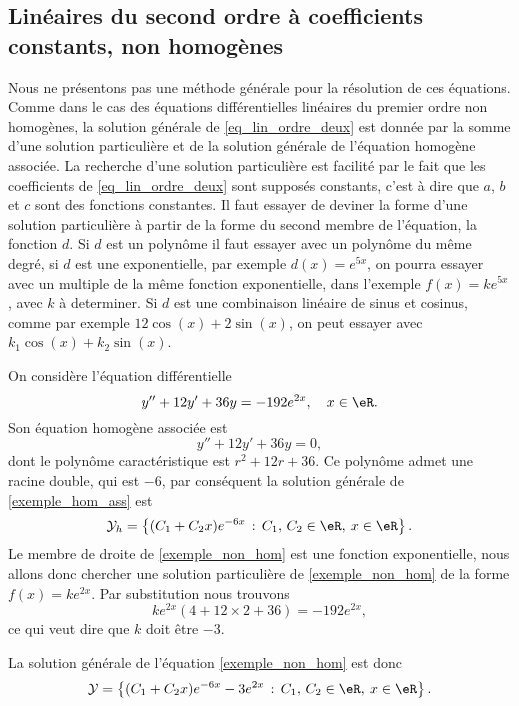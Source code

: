 \subsection{Linéaires du second ordre à coefficients constants, non homogènes}

Nous ne présentons pas une méthode générale pour la résolution de ces équations. Comme dans le cas des équations différentielles linéaires du premier ordre non homogènes, la solution générale de \eqref{eq_lin_ordre_deux} est donnée par la somme d'une solution particulière et de la solution générale de l'équation homogène associée. La recherche d'une solution particulière est facilité par le fait que les coefficients de \eqref{eq_lin_ordre_deux} sont supposés constants, c'est à dire que $a$, $b$ et $c$ sont des fonctions constantes. Il faut essayer de deviner la forme d'une solution particulière à partir de la forme du second membre de l'équation, la fonction $d$. Si $d$ est un polynôme il faut essayer avec un polynôme du même degré, si $d$ est une exponentielle, par exemple $d(x) = e^{5x}$, on pourra essayer avec un multiple de la m\^eme fonction exponentielle, dans l'exemple $f(x) = k e^{5x}$, avec $k$ à determiner. Si $d$ est une combinaison linéaire de sinus et cosinus, comme par exemple $12\cos(x) + 2\sin(x)$, on peut essayer avec $k_1\cos(x) + k_2\sin(x)$.

\begin{example}
  On considère l'équation différentielle
  \begin{equation}\label{exemple_non_hom}
    y'' + 12y' + 36 y = -192 e^{2x}, \quad x\in\eR.
  \end{equation}
  Son équation homogène associée est
\begin{equation}\label{exemple_hom_ass}
    y'' + 12y' + 36 y = 0,
  \end{equation}
dont le polynôme caractéristique est $r^2 + 12 r + 36$. Ce polynôme admet une racine double, qui est $-6$, par conséquent la solution générale de \eqref{exemple_hom_ass} est
\begin{equation*}
      \mathcal{Y}_h  = \left\{(C_1  +C_2x) e^{-6 x} \,:\, C_1,\, C_2 \in \eR, \: x\in \eR\right\}.
    \end{equation*}
Le membre de droite de \eqref{exemple_non_hom} est une fonction exponentielle, nous allons donc chercher une solution particulière de \eqref{exemple_non_hom} de la forme $f(x) = ke^{2x}$. Par substitution nous trouvons
\[
  ke^{2x}(4 + 12 \times 2 +36) = -192 e^{2x},
\]
ce qui veut dire que $k$ doit \^etre $-3$.

La solution générale de l'équation \eqref{exemple_non_hom} est donc
\begin{equation*}
      \mathcal{Y}  = \left\{(C_1  +C_2x) e^{-6 x} -3e^{2x} \,:\, C_1,\, C_2 \in \eR, \: x\in \eR\right\}.
    \end{equation*}
\end{example}

